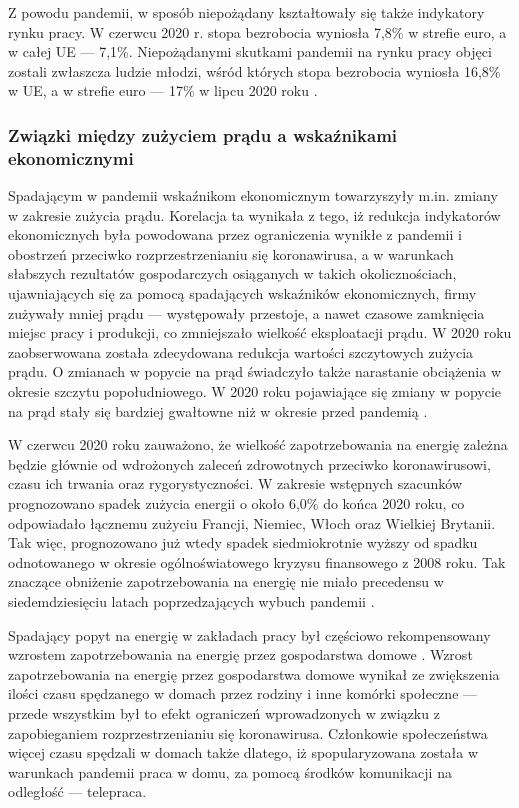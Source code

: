 \documentclass[polish, twoside, 12pt, a4paper]{article}
\theoremstyle{definition}
\theoremstyle{plain}
\theoremstyle{remark}
\begin{document}
Z powodu pandemii, w sposób niepożądany kształtowały się także indykatory rynku pracy. W czerwcu 2020 r. stopa bezrobocia wyniosła 7,8\% w strefie euro, a w całej UE --- 7,1\%. Niepożądanymi skutkami pandemii na rynku pracy objęci zostali zwłaszcza ludzie młodzi, wśród których stopa bezrobocia wyniosła 16,8\% w UE, a w strefie euro --- 17\% w lipcu 2020 roku \parencite{dziembala2021}.

\subsubsection{Związki między zużyciem prądu a wskaźnikami ekonomicznymi}

Spadającym w pandemii wskaźnikom ekonomicznym towarzyszyły m.in. zmiany w zakresie zużycia prądu. Korelacja ta wynikała z tego, iż redukcja indykatorów ekonomicznych była powodowana przez ograniczenia wynikłe z pandemii i obostrzeń przeciwko rozprzestrzenianiu się koronawirusa, a w warunkach słabszych rezultatów gospodarczych osiąganych w takich okolicznościach, ujawniających się za pomocą spadających wskaźników ekonomicznych, firmy zużywały mniej prądu --- występowały przestoje, a nawet czasowe zamknięcia miejsc pracy i produkcji, co zmniejszało wielkość eksploatacji prądu. W 2020 roku zaobserwowana została zdecydowana redukcja wartości szczytowych zużycia prądu. O zmianach w popycie na prąd świadczyło także narastanie obciążenia w okresie szczytu popołudniowego. W 2020 roku pojawiające się zmiany w popycie na prąd stały się bardziej gwałtowne niż w okresie przed pandemią \parencite{stahl2021}. 

W czerwcu 2020 roku zauważono, że wielkość zapotrzebowania na energię zależna będzie głównie od wdrożonych zaleceń zdrowotnych przeciwko koronawirusowi, czasu ich trwania oraz rygorystyczności. W zakresie wstępnych szacunków prognozowano spadek zużycia energii o około 6,0\% do końca 2020 roku, co odpowiadało łącznemu zużyciu Francji, Niemiec, Włoch oraz Wielkiej Brytanii. Tak więc, prognozowano już wtedy spadek siedmiokrotnie wyższy od spadku odnotowanego w okresie ogólnoświatowego kryzysu finansowego z 2008 roku. Tak znaczące obniżenie zapotrzebowania na energię nie miało precedensu w siedemdziesięciu latach poprzedzających wybuch pandemii \parencite{kolenda2020}. 

Spadający popyt na energię w zakładach pracy był częściowo rekompensowany wzrostem zapotrzebowania na energię przez gospodarstwa domowe \parencite{cire2023}. Wzrost zapotrzebowania na energię przez gospodarstwa domowe wynikał ze zwiększenia ilości czasu spędzanego w domach przez rodziny i inne komórki społeczne --- przede wszystkim był to efekt ograniczeń wprowadzonych w związku z zapobieganiem rozprzestrzenianiu się koronawirusa. Członkowie społeczeństwa więcej czasu spędzali w domach także dlatego, iż spopularyzowana została w warunkach pandemii praca w domu, za pomocą środków komunikacji na odległość --- telepraca. 
\end{document}
